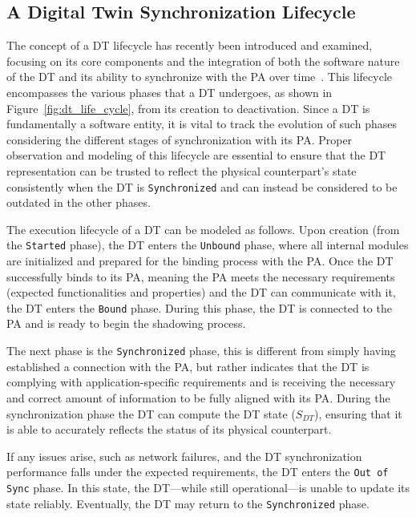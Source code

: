 
\subsection{A Digital Twin Synchronization Lifecycle}

The concept of a \ac{DT} lifecycle has recently been introduced and examined, focusing on its core components and the integration of both the software nature of the \ac{DT} and its ability to synchronize with the \ac{PA} over time~\cite{web-of-dt-ricci-2022}.
%
This lifecycle encompasses the various phases that a \ac{DT} undergoes, as shown in Figure~\ref{fig:dt_life_cycle}, from its creation to deactivation.
%
Since a \ac{DT} is fundamentally a software entity, it is vital to track the evolution of such phases considering the different stages of synchronization with its \ac{PA}.
Proper observation and modeling of this lifecycle are essential to ensure that the \ac{DT} representation can be trusted to reflect the physical counterpart's state consistently when the \ac{DT} is \texttt{Synchronized} and can instead be considered to be outdated in the other phases.

The execution lifecycle of a \ac{DT} can be modeled as follows.
Upon creation (from the \texttt{Started} phase),
the \ac{DT} enters the \texttt{Unbound} phase, where all internal modules are initialized and prepared for the binding process with the \ac{PA}.
%
Once the \ac{DT} successfully binds to its \ac{PA},
meaning the \ac{PA} meets the necessary requirements (expected functionalities and properties)
and the \ac{DT} can communicate with it,
the \ac{DT} enters the \texttt{Bound} phase.
%
During this phase, the \ac{DT} is connected to the \ac{PA} and is ready to begin the shadowing process.

The next phase is the \texttt{Synchronized} phase, 
this is different from simply having established a connection with the \ac{PA}, 
but rather indicates that the \ac{DT} is complying with application-specific requirements
and is receiving the necessary and correct amount of information to be fully aligned with its \ac{PA}.
%
During the synchronization phase the \ac{DT} can compute the \ac{DT} state ($S_{DT}$), ensuring that it is able to accurately reflects the status of its physical counterpart.

If any issues arise, such as network failures, and the \ac{DT} synchronization performance falls under the expected requirements, the \ac{DT} enters the \texttt{Out of Sync} phase.
In this state, the \ac{DT}---while still operational---is unable to update its state reliably. 
%
Eventually, the \ac{DT} may return to the \texttt{Synchronized} phase.

